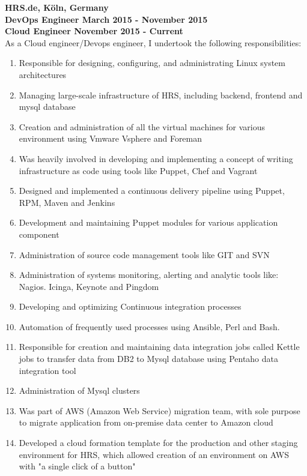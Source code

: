\documentclass[11.9pt]{xetexCV}
\begin{document}
\textbf{{\color{bluesubheading}HRS.de, K{\"o}ln, Germany}} \\
\textbf{{\color{bluesubheading}DevOps Engineer March 2015 - November 2015}}\\
\vspace{1.5mm}%
\textbf{{\color{bluesubheading}Cloud Engineer November 2015 - Current}}\\
As a Cloud engineer/Devops engineer, I undertook the following responsibilities:
\begin{enumerate}[leftmargin=4.5cm,label=\textbullet]
\item Responsible for designing, configuring, and administrating Linux system architectures
\item Managing large-scale infrastructure of HRS, including backend, frontend and mysql database
\item Creation and administration of all the virtual machines for various environment using Vmware Vsphere and Foreman
\item Was heavily involved in developing and implementing a concept of writing infrastructure as code using tools like Puppet, Chef and Vagrant
\item Designed and implemented a continuous delivery pipeline using Puppet, RPM, Maven and Jenkins
\item Development and maintaining Puppet modules for various application component
\item Administration of source code management tools like GIT and SVN
\item Administration of systems monitoring, alerting and analytic tools like: Nagios. Icinga, Keynote and Pingdom
\item Developing and optimizing Continuous integration processes
\item Automation of frequently used processes using Ansible, Perl and Bash.
\item Responsible for creation and maintaining data integration jobs called Kettle jobs to transfer data from DB2 to Mysql database using Pentaho data integration tool
\item Administration of Mysql clusters
\item Was part of AWS (Amazon Web Service) migration team, with sole purpose to migrate application from on-premise data center to Amazon cloud
\item Developed a cloud formation template for the production and other staging environment for HRS, which allowed creation of an environment on AWS with "a single click of a button"
\end{enumerate}
\end{document}
